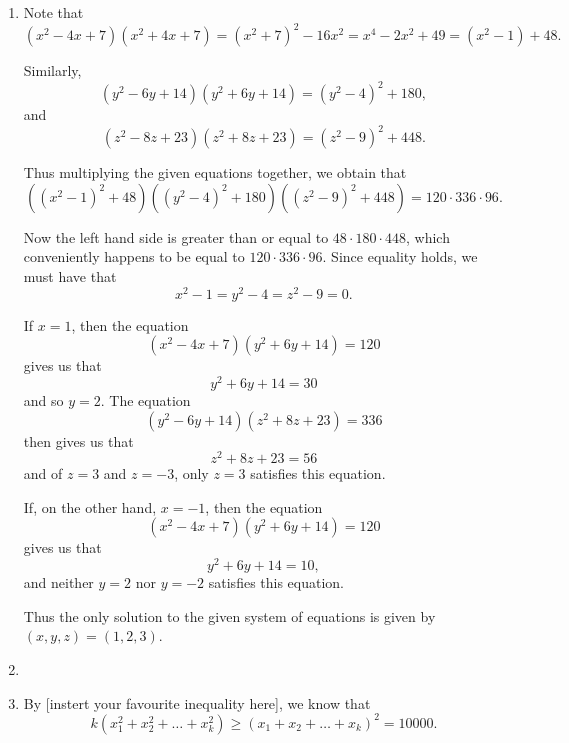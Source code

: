 \documentclass[12pt]{article}
\begin{document}
\begin{enumerate}
\item %
Note that
\[
    (x^2 - 4x + 7)(x^2 + 4x + 7) = (x^2 + 7)^2 - 16x^2 = x^4 - 2x^2 + 49 = (x^2
    - 1) + 48.
\]

Similarly,
\[
    (y^2 - 6y + 14)(y^2 + 6y + 14) = (y^2 - 4)^2 + 180,
\]
and
\[
    (z^2 - 8z + 23)(z^2 + 8z + 23) = (z^2 - 9)^2 + 448.
\]

Thus multiplying the given equations together, we obtain that
\[
    \left( (x^2 - 1)^2 + 48 \right) \left( (y^2 - 4)^2 + 180 \right) \left( (z^2
    - 9)^2 + 448 \right) = 120 \cdot 336 \cdot 96.
\]

Now the left hand side is greater than or equal to $48 \cdot 180 \cdot 448$,
which conveniently happens to be equal to $120 \cdot 336 \cdot 96$. Since
equality holds, we must have that
\[
    x^2 - 1 = y^2 - 4 = z^2 - 9 = 0.
\]

If $x = 1$, then the equation
\[
    (x^2 - 4x + 7)(y^2 + 6y + 14) = 120
\]
gives us that
\[
    y^2 + 6y + 14 = 30
\]
and so $y = 2$. The equation
\[
    (y^2 - 6y + 14)(z^2 + 8z + 23) = 336
\]
then gives us that
\[
    z^2 + 8z + 23 = 56
\]
and of $z = 3$ and $z = -3$, only $z = 3$ satisfies this equation.

If, on the other hand, $x = -1$, then the equation
\[
    (x^2 - 4x + 7)(y^2 + 6y + 14) = 120
\]
gives us that
\[
    y^2 + 6y + 14 = 10,
\]
and neither $y = 2$ nor $y = -2$ satisfies this equation.

Thus the only solution to the given system of equations is given by $(x, y, z) =
(1, 2, 3)$.



\item %


\item %
By [instert your favourite inequality here], we know that
\[
    k(x_1^2 + x_2^2 + \dots + x_k^2) \geq (x_1 + x_2 + \dots + x_k)^2 = 10000.
\]


\end{enumerate}
\end{document}
